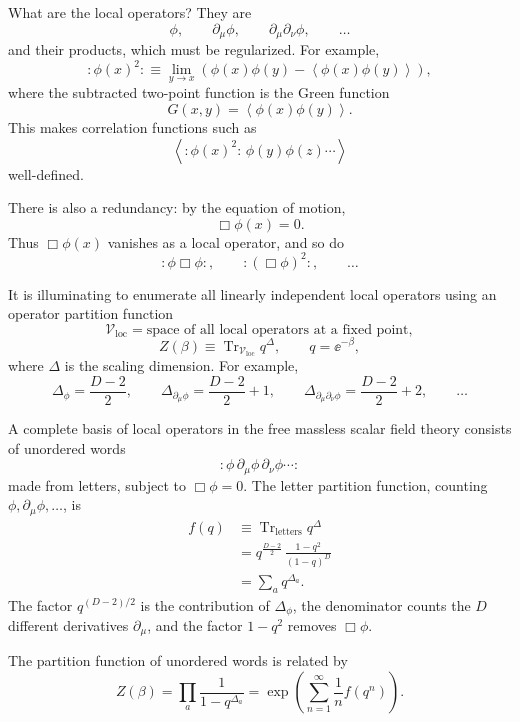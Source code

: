 What are the local operators?  They are
\[
  \phi,\qquad
  \partial_\mu\phi,\qquad
  \partial_\mu\partial_\nu\phi,\qquad \ldots
\]
and their products, which must be regularized.  For example,
\[
  :\phi(x)^2:
  \equiv
  \lim_{y\to x}
  \left(
    \phi(x)\phi(y)-\left\langle\phi(x)\phi(y)\right\rangle
  \right),
\]
where the subtracted two-point function is the Green function
\[
  G(x,y)=\left\langle\phi(x)\phi(y)\right\rangle .
\]
This makes correlation functions such as
\[
  \left\langle
    :\phi(x)^2:\,\phi(y)\phi(z)\cdots
  \right\rangle
\]
well-defined.

There is also a redundancy: by the equation of motion,
\[
  \Box\phi(x)=0.
\]
Thus \(\Box\phi(x)\) vanishes as a local operator, and so do
\[
  :\phi\Box\phi:,\qquad
  :(\Box\phi)^2:,\qquad \ldots
\]

It is illuminating to enumerate all linearly independent local
operators using an operator partition function
\[
  \mathcal V_{\mathrm{loc}}
  =
  \text{space of all local operators at a fixed point},
\]
\[
  Z(\beta)
  \equiv
  \operatorname{Tr}_{\mathcal V_{\mathrm{loc}}}q^\Delta,
  \qquad
  q=\ee^{-\beta},
\]
where \(\Delta\) is the scaling dimension.  For example,
\[
  \Delta_\phi=\frac{D-2}{2},
  \qquad
  \Delta_{\partial_\mu\phi}=\frac{D-2}{2}+1,
  \qquad
  \Delta_{\partial_\mu\partial_\nu\phi}=\frac{D-2}{2}+2,
  \qquad \ldots
\]

A complete basis of local operators in the free massless scalar field
theory consists of unordered words
\[
  :\phi\,\partial_\mu\phi\,\partial_\nu\phi\cdots:
\]
made from letters, subject to \(\Box\phi=0\).  The letter partition
function, counting
\(\phi,\partial_\mu\phi,\ldots\), is
\[
\begin{aligned}
  f(q)
  &\equiv
  \operatorname{Tr}_{\mathrm{letters}} q^\Delta
\\
  &=
  q^{\frac{D-2}{2}}\,
  \frac{1-q^2}{(1-q)^D}
\\
  &=
  \sum_a q^{\Delta_a}.
\end{aligned}
\]
The factor \(q^{(D-2)/2}\) is the contribution of \(\Delta_\phi\), the
denominator counts the \(D\) different derivatives
\(\partial_\mu\), and the factor \(1-q^2\) removes \(\Box\phi\).

The partition function of unordered words is related by
\[
  Z(\beta)
  =
  \prod_a \frac1{1-q^{\Delta_a}}
  =
  \exp\left(
    \sum_{n=1}^{\infty}\frac1n f(q^n)
  \right).
\]


